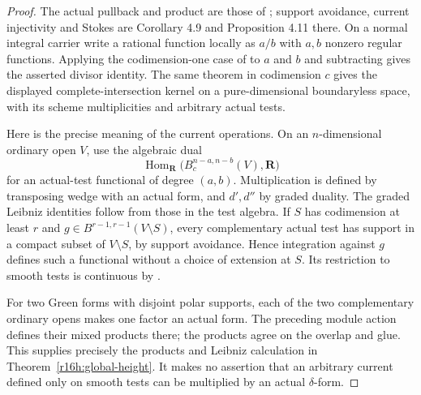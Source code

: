 \documentclass[11pt,a4paper]{article}
\theoremstyle{definition}
\theoremstyle{remark}
\numberwithin{equation}{section}
\begin{document}
\begin{proof}
The actual pullback and product are those of \cite[Definition 4.2 and Theorem 4.5]{M}; support avoidance, current injectivity and Stokes are Corollary 4.9 and Proposition 4.11 there. On a normal integral carrier write a rational function locally as $a/b$ with $a,b$ nonzero regular functions. Applying the codimension-one case of \cite[Theorem 5.5]{M} to $a$ and $b$ and subtracting gives the asserted divisor identity. The same theorem in codimension $c$ gives the displayed complete-intersection kernel on a pure-dimensional boundaryless space, with its scheme multiplicities and arbitrary actual tests.

Here is the precise meaning of the current operations. On an $n$-dimensional ordinary open $V$, use the algebraic dual
\[
 \operatorname{Hom}_{\mathbf R}\bigl(B_c^{n-a,n-b}(V),\mathbf R\bigr)
\]
for an actual-test functional of degree $(a,b)$. Multiplication is defined by transposing wedge with an actual form, and $d',d''$ by graded duality. The graded Leibniz identities follow from those in the test algebra. If $S$ has codimension at least $r$ and $g\in B^{r-1,r-1}(V\setminus S)$, every complementary actual test has support in a compact subset of $V\setminus S$, by support avoidance. Hence integration against $g$ defines such a functional without a choice of extension at $S$. Its restriction to smooth tests is continuous by \cite[Lemma 5.1]{M}.

For two Green forms with disjoint polar supports, each of the two complementary ordinary opens makes one factor an actual form. The preceding module action defines their mixed products there; the products agree on the overlap and glue. This supplies precisely the products and Leibniz calculation in Theorem~\ref{r16h:global-height}. It makes no assertion that an arbitrary current defined only on smooth tests can be multiplied by an actual $\delta$-form.
\end{proof}
\end{document}
